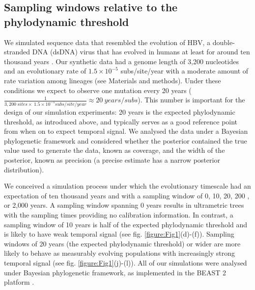 \documentclass[11pt]{article}
\begin{document}
\subsection{Sampling windows relative to the phylodynamic threshold}
We simulated sequence data that resembled the evolution of HBV, a double-stranded DNA (dsDNA) virus that has evolved in humans at least for around ten thousand years \citep{kocher2021ten}. Our synthetic data had a genome length of 3,200 nucleotides and an evolutionary rate of $1.5\times10^{-5}$ subs/site/year \citep{kocher2021ten, muhlemann2018ancient} with a moderate amount of rate variation among lineages (see Materials and methods). Under these conditions we expect to observe one mutation every 20 years ($\frac{1}{3,200\ sites \times\ 1.5\times10^{-5}subs/site/year}\approx20\ years/subs$). This number is important for the design of our simulation experiments: 20 years is the expected phylodynamic threshold, as introduced above, and typically serves as a good reference point from when on to expect temporal signal. We analysed the data under a Bayesian phylogenetic framework and considered whether the posterior contained the true value used to generate the data, known as coverage, and the width of the posterior, known as precision (a precise estimate has a narrow posterior distribution).

We conceived a simulation process under which the evolutionary timescale had an expectation of ten thousand years and with a sampling window of 0, 10, 20, 200 , or 2,000 years. A sampling window spanning 0 years results in ultrametric trees with the sampling times providing no calibration information. In contrast, a sampling window of 10 years is half of the expected phylodynamic threshold and is likely to have weak temporal signal (see fig. \ref{figure:Fig1}(d)-(f)). Sampling windows of 20 years (the expected phylodynamic threshold) or wider are more likely to behave as measurably evolving populations with increasingly strong temporal signal (see fig. \ref{figure:Fig1}(j)-(l)). All of our simulations were analysed under Bayesian phylogenetic framework, as implemented in the BEAST 2 platform \citep{bouckaert2019beast}.
\end{document}
